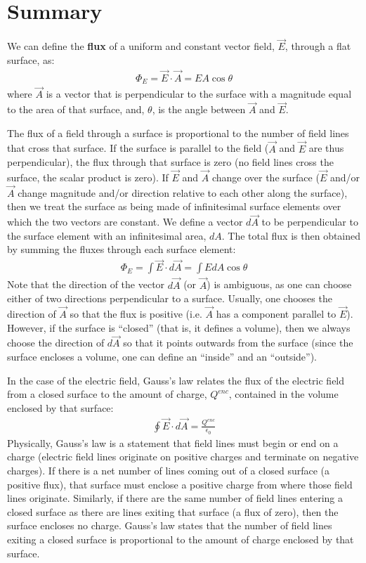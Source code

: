 \section{Summary}
\bigskip
\vspace{-1cm}
\bigskip
\begin{chapterSummary}
We can define the \textbf{flux} of a uniform and constant vector field, $\vec E$, through a flat surface, as:
\begin{align*}
\Phi_E = \vec E \cdot \vec A = EA\cos\theta
\end{align*}
where $\vec A$ is a vector that is perpendicular to the surface with a magnitude equal to the area of that surface, and, $\theta$, is the angle between $\vec A$ and $\vec E$. 

The flux of a field through a surface is proportional to the number of field lines that cross that surface. If the surface is parallel to the field ($\vec A$ and $\vec E$ are thus perpendicular), the flux through that surface is zero (no field lines cross the surface, the scalar product is zero). If $\vec E$ and $\vec A$ change over the surface ($\vec E$ and/or $\vec A$ change magnitude and/or direction relative to each other along the surface), then we treat the surface as being made of infinitesimal surface elements over which the two vectors are constant. We define a vector $d\vec A$ to be perpendicular to the surface element with an infinitesimal area, $dA$. The total flux is then obtained by summing the fluxes through each surface element:
\begin{align*}
\Phi_E=\int \vec E \cdot d\vec A=\int EdA\cos\theta
\end{align*}
Note that the direction of the vector $d\vec A$ (or $\vec A$) is ambiguous, as one can choose either of two directions perpendicular to a surface. Usually, one chooses the direction of $\vec A$ so that the flux is positive (i.e. $\vec A$ has a component parallel to $\vec E$). However, if the surface is ``closed'' (that is, it defines a volume), then we always choose the direction of $d\vec A$ so that it points outwards from the surface (since the surface encloses a volume, one can define an ``inside'' and an ``outside''). 

In the case of the electric field, Gauss's law relates the flux of the electric field from a closed surface to the amount of charge, $Q^{enc}$, contained in the volume enclosed by that surface:
\begin{align*}
\oint \vec E \cdot d\vec A = \frac{Q^{enc}}{\epsilon_0}
\end{align*}
Physically, Gauss's law is a statement that field lines must begin or end on a charge (electric field lines originate on positive charges and terminate on negative charges). If there is a net number of lines coming out of a closed surface (a positive flux), that surface must enclose a positive charge from where those field lines originate. Similarly, if there are the same number of field lines entering a closed surface as there are lines exiting that surface (a flux of zero), then the surface encloses no charge. Gauss's law states that the number of field lines exiting a closed surface is proportional to the amount of charge enclosed by that surface.


\end{chapterSummary}
